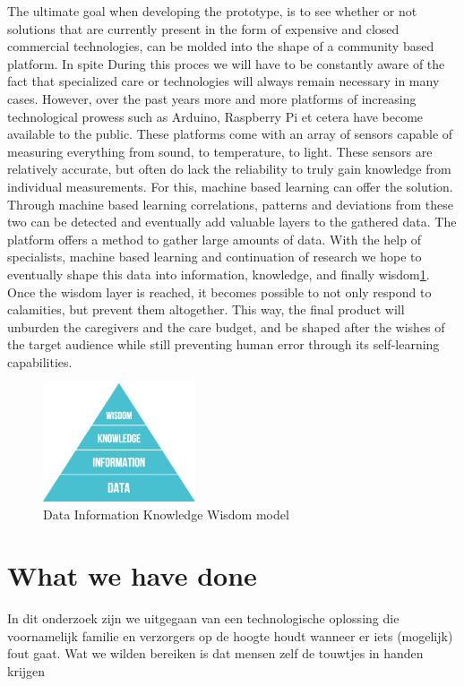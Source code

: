 \documentclass{below-ext}
\begin{document}
The ultimate goal when developing the prototype, is to see whether or not solutions that are currently present in the form of expensive and closed commercial technologies, can be molded into the shape of a community based platform. In spite During this proces we will have to be constantly aware of the fact that specialized care or technologies will always remain necessary in many cases. However, over the past years more and more platforms of increasing technological prowess such as Arduino, Raspberry Pi et cetera have become available to the public. These platforms come with an array of sensors capable of measuring everything from sound, to temperature, to light. These sensors are relatively accurate, but often do lack the reliability to truly gain knowledge from individual measurements. For this, machine based learning can offer the solution. Through machine based learning correlations, patterns and deviations from these two can be detected and eventually add valuable layers to the gathered data. The platform offers a method to gather large amounts of data. With the help of specialists, machine based learning and continuation of research we hope to eventually shape this data into information, knowledge, and finally wisdom\ref{fig:dikw}. Once the wisdom layer is reached, it becomes possible to not only respond to calamities, but prevent them altogether. This way, the final product will unburden the caregivers and the care budget, and  be shaped after the wishes of the target audience  while still preventing human error through its self-learning capabilities.

\begin{figure}
\centering
\label{fig:dikw}
\includegraphics[width=0.4\textwidth]{dikw}
\caption{Data Information Knowledge Wisdom model}
\end{figure}
\section{What we have done}
In dit onderzoek zijn we uitgegaan van een technologische oplossing die voornamelijk familie en verzorgers op de hoogte houdt wanneer er iets (mogelijk) fout gaat. Wat we wilden bereiken is dat mensen zelf de touwtjes in handen krijgen
\end{document}
